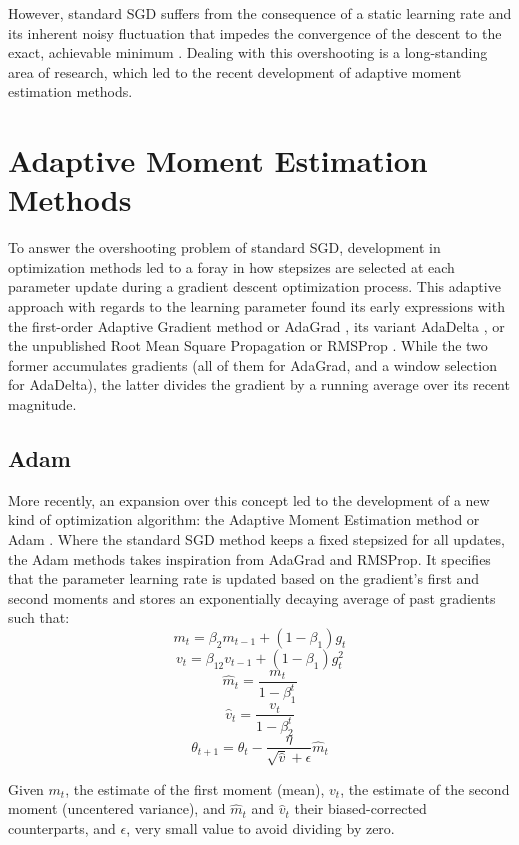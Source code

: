 \documentclass{article} %
\begin{document}
However, standard SGD suffers from the consequence of a static learning rate and its 
inherent noisy fluctuation that impedes the convergence of the descent to the exact, achievable
minimum \citep{inproceedings}. Dealing with this overshooting is a long-standing area of research, 
which led to the recent development of adaptive moment estimation methods.

\section{Adaptive Moment Estimation Methods}
\label{gen_in}

To answer the overshooting problem of standard SGD, development in optimization methods led to 
a foray in how stepsizes are selected at each parameter update during a gradient descent optimization
process. This adaptive approach with regards to the learning parameter found its early expressions 
with the first-order Adaptive Gradient method or AdaGrad \citep{adagrad}, its variant AdaDelta 
\citep{DBLP:journals/corr/abs-1212-5701}, or the unpublished Root Mean Square Propagation or RMSProp
\citep{rms}. While the two former accumulates gradients (all of them for AdaGrad, and a window 
selection for AdaDelta), the latter divides the gradient by a running average over its recent magnitude.

\subsection{Adam}

More recently, an expansion over this concept led to the development of a new kind of optimization
algorithm: the Adaptive Moment Estimation method or Adam \citep{kingma2017adam}. Where the standard 
SGD method keeps a fixed stepsized for all updates, the Adam methods takes inspiration from AdaGrad
and RMSProp. It specifies that the parameter learning rate is updated based on the gradient's first
and second moments and stores an exponentially decaying average of past gradients such that:
$$m_t = \beta_2m_{t-1} + (1-\beta_1)g_t$$
$$v_t = \beta_12v_{t-1} + (1-\beta_1)g^2_t$$
$$\hat{m}_t = \frac{m_t}{1-\beta_1^t}$$
$$\hat{v}_t = \frac{v_t}{1-\beta_2^t}$$
$$\theta_{t+1} = \theta_t - \frac{\eta}{\sqrt{\hat{v}}+\epsilon}\hat{m}_t$$

Given $m_t$, the estimate of the first moment (mean), $v_t$, the estimate of the second moment 
(uncentered variance), and $\hat{m}_t$ and $\hat{v}_t$ their biased-corrected counterparts, 
and $\epsilon$, very small value to avoid dividing by zero. 
\end{document}
